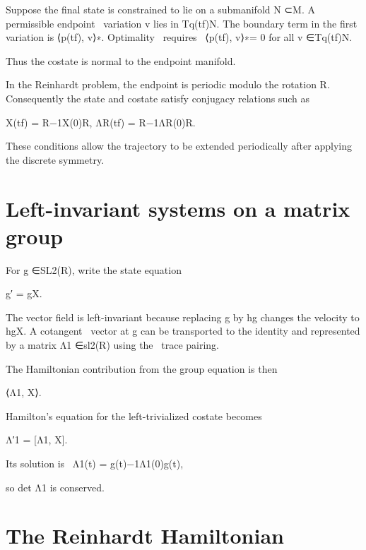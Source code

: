 \begin{displaytext}
Suppose the final state is constrained to lie on a submanifold N ⊂M. A permissible endpoint \
variation v lies in Tq(tf)N. The boundary term in the first variation is ⟨p(tf), v⟩∗. Optimality \
requires \
⟨p(tf), v⟩∗= 0 for all v ∈Tq(tf)N.
\end{displaytext}

Thus the costate is normal to the endpoint manifold.


In the Reinhardt problem, the endpoint is periodic modulo the rotation R. Consequently the state and costate satisfy conjugacy relations such as


\begin{displaytext}
X(tf) = R−1X(0)R, ΛR(tf) = R−1ΛR(0)R.
\end{displaytext}

These conditions allow the trajectory to be extended periodically after applying the discrete symmetry.


\section{Left-invariant systems on a matrix group}

For g ∈SL2(R), write the state equation


g′ = gX.


\begin{displaytext}
The vector field is left-invariant because replacing g by hg changes the velocity to hgX. A cotangent \
vector at g can be transported to the identity and represented by a matrix Λ1 ∈sl2(R) using the \
trace pairing.
\end{displaytext}

The Hamiltonian contribution from the group equation is then


⟨Λ1, X⟩.


Hamilton’s equation for the left-trivialized costate becomes


\begin{displaytext}
Λ′1 = [Λ1, X].
\end{displaytext}

\begin{displaytext}
Its solution is \
Λ1(t) = g(t)−1Λ1(0)g(t),
\end{displaytext}

so det Λ1 is conserved.


\section{The Reinhardt Hamiltonian}

